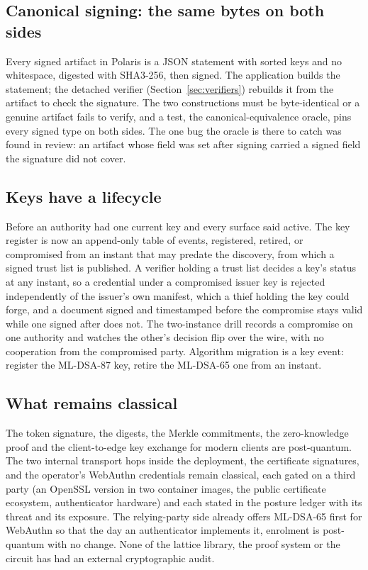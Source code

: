 \subsection{Canonical signing: the same bytes on both sides}

Every signed artifact in Polaris is a JSON statement with sorted keys and no whitespace, digested
with SHA3-256, then signed. The application builds the statement; the detached verifier
(Section~\ref{sec:verifiers}) rebuilds it from the artifact to check the signature. The two
constructions must be byte-identical or a genuine artifact fails to verify, and a test, the
canonical-equivalence oracle, pins every signed type on both sides. The one bug the oracle is there
to catch was found in review: an artifact whose  field was set after signing carried
a signed field the signature did not cover. \sImpl

\subsection{Keys have a lifecycle}

Before  an authority had one current key and every surface said active. The key
register is now an append-only table of events, registered, retired, or compromised from an instant
that may predate the discovery, from which a signed trust list is published. A verifier holding a
trust list decides a key's status at any instant, so a credential under a compromised issuer key is
rejected independently of the issuer's own manifest, which a thief holding the key could forge, and
a document signed and timestamped before the compromise stays valid while one signed after does not.
The two-instance drill records a compromise on one authority and watches the other's decision flip
over the wire, with no cooperation from the compromised party. Algorithm migration is a key event:
register the ML-DSA-87 key, retire the ML-DSA-65 one from an instant. \sImpl

\subsection{What remains classical}

The token signature, the digests, the Merkle commitments, the zero-knowledge proof and the
client-to-edge key exchange for modern clients are post-quantum. The two internal transport hops
inside the deployment, the certificate signatures, and the operator's WebAuthn credentials remain
classical, each gated on a third party (an OpenSSL version in two container images, the public
certificate ecosystem, authenticator hardware) and each stated in the posture ledger with its
threat and its exposure. The relying-party side already offers ML-DSA-65 first for WebAuthn so
that the day an authenticator implements it, enrolment is post-quantum with no change. None of the
lattice library, the proof system or the circuit has had an external cryptographic audit. \sExt

